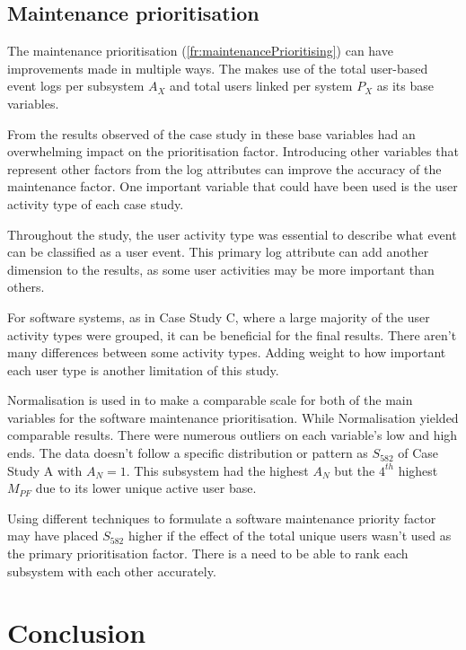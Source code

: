 \subsection{Maintenance prioritisation}
The maintenance prioritisation (\ref{fr:maintenancePrioritising}) can have improvements made in
multiple ways. The
 makes use
of the total user-based event logs per subsystem $A_X$ and total users linked per system $P_X$ as
its base variables.\par From the results observed of the case study in 
these base variables had an overwhelming impact on the prioritisation factor. Introducing other
variables that represent other factors from the log attributes can improve the accuracy of the
maintenance factor. One important variable that could have been used is the user activity type of
each case study.\par Throughout the study, the user activity type was essential to describe what
event can be classified as a user event. This primary log attribute can add another dimension to the
results, as some user activities may be more important than others. \par For software systems, as in
Case Study C, where a large majority of the user activity types were grouped, it can be beneficial
for the final results. There aren't many differences between some activity types. Adding weight to
how important each user type is another limitation of this study.\par Normalisation is used in
 to make a
comparable scale for both of the main variables for the software maintenance prioritisation. While
Normalisation yielded comparable results. There were numerous outliers on each variable's low and
high ends. The data doesn't follow a specific distribution or pattern as $S_{582}$ of Case Study A
with $A_N=1$. This subsystem had the highest $A_N$ but the $4^{th}$ highest $M_{PF}$ due to its
lower unique active user base.\par Using different techniques to formulate a software maintenance
priority factor may have placed $S_{582}$ higher if the effect of the total unique users wasn't used
as the primary prioritisation factor. There is a need to be able to rank each subsystem with each
other accurately.

\section{Conclusion}

